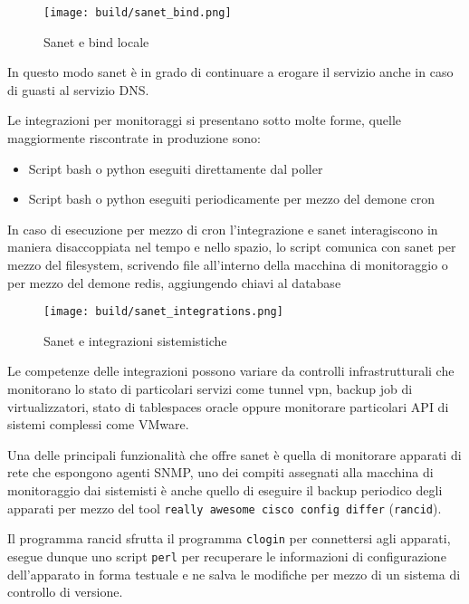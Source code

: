 \begin{figure}[H]
    \centering
    \texttt{[image: build/sanet\_bind.png]}
    \caption{Sanet e bind locale}
    \label{fig:enter-label}
\end{figure}

In questo modo sanet è in grado di continuare a erogare il servizio anche in caso di guasti al servizio DNS.

Le integrazioni per monitoraggi si presentano sotto molte forme, quelle maggiormente riscontrate in produzione sono:

\begin{itemize}
  \item{Script bash o python eseguiti direttamente dal poller}
  \item{Script bash o python eseguiti periodicamente per mezzo del demone cron}
\end{itemize}

In caso di esecuzione per mezzo di cron l'integrazione e sanet interagiscono in maniera disaccoppiata nel tempo e nello spazio, lo script comunica con sanet per mezzo del filesystem, scrivendo file all'interno della macchina di monitoraggio o per mezzo del demone redis, aggiungendo chiavi al database

\begin{figure}[H]
    \centering
    \texttt{[image: build/sanet\_integrations.png]}
    \caption{Sanet e integrazioni sistemistiche}
    \label{fig:enter-label}
\end{figure}

Le competenze delle integrazioni possono variare da controlli infrastrutturali che monitorano lo stato di particolari servizi come tunnel vpn, backup job di virtualizzatori, stato di tablespaces oracle oppure monitorare particolari API di sistemi complessi come VMware.

Una delle principali funzionalità che offre sanet è quella di monitorare apparati di rete che espongono agenti SNMP, uno dei compiti assegnati alla macchina di monitoraggio dai sistemisti è anche quello di eseguire il backup periodico degli apparati per mezzo del tool \verb|really awesome cisco config differ| (\verb|rancid|).

Il programma rancid sfrutta il programma \verb|clogin| per connettersi agli apparati, esegue dunque uno script \verb|perl| per recuperare le informazioni di configurazione dell'apparato in forma testuale e ne salva le modifiche per mezzo di un sistema di controllo di versione.

